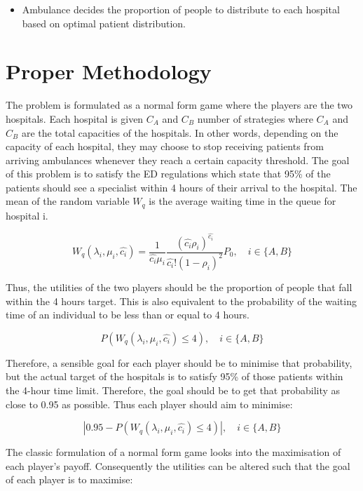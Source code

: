 \documentclass{article}
\begin{document}
\begin{itemize}
    \item Ambulance decides the proportion of people to distribute to each hospital based on optimal patient distribution.
\end{itemize}

\newpage
\section{Proper Methodology}
The problem is formulated as a normal form game where the players are the two hospitals. Each hospital is given $C_A$ and $C_B$ number of strategies where $C_A$ and $C_B$ are the total capacities of the hospitals. In other words, depending on the capacity of each hospital, they may choose to stop receiving patients from arriving ambulances whenever they reach a certain capacity threshold. The goal of this problem is to satisfy the ED regulations which state that 95\% of the patients should see a specialist within 4 hours of their arrival to the hospital. The mean of the random variable $W_q$ is the average waiting time in the queue for hospital i.


\begin{equation}
     W_q(\lambda_i, \mu_i, \hat{c_i}) = \frac{1}{\hat{c_i} \mu_i} \frac{(\hat{c_i} \rho_i) ^ {\hat{c_i}}}{\hat{c_i}! (1 - \rho_i) ^ 2}P_0, \quad i \in \{A,B\}
\end{equation}

Thus, the utilities of the two players should be the proportion of people that fall within the 4 hours target. This is also equivalent to the probability of the waiting time of an individual to be less than or equal to 4 hours. 

\begin{equation}
    P(W_q(\lambda_i, \mu_i, \hat{c_i}) \leq 4), \quad i \in \{A,B\}
\end{equation}

Therefore, a sensible goal for each player should be to minimise that probability, but the actual target of the hospitals is to satisfy 95\% of those patients within the 4-hour time limit. Therefore, the goal should be to get that probability as close to 0.95 as possible. Thus each player should aim to minimise:

\begin{equation}
    |0.95 - P(W_q(\lambda_i, \mu_i, \hat{c_i}) \leq 4)|, \quad i \in \{A,B\}
\end{equation}

The classic formulation of a normal form game looks into the maximisation of each player's payoff. Consequently the utilities can be altered such that the goal of each player is to maximise:
\end{document}
